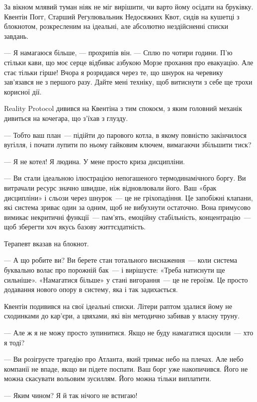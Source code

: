 \documentclass[12pt, a4paper, openany]{book}
\begin{document}
\begin{realitybox}
За вікном млявий туман ніяк не міг вирішити, чи варто йому осідати на бруківку. Квентін Погг, Старший Регулювальник Недосяжних Квот, сидів на кушетці з блокнотом, розкресленим на ідеальні, але абсолютно нездійсненні списки завдань.

--- Я намагаюся більше, --- прохрипів він. --- Сплю по чотири години. П'ю стільки кави, що моє серце відбиває азбукою Морзе прохання про евакуацію. Але стає тільки гірше! Вчора я розридався через те, що шнурок на черевику зав'язався не з першого разу. Дайте мені техніку, щоб витиснути з себе ще трохи корисної дії.

\medskip
Reality Protocol дивився на Квентіна з тим спокоєм, з яким головний механік дивиться на кочегара, що з'їхав з глузду.

--- Тобто ваш план~--- підійти до парового котла, в якому повністю закінчилося вугілля, і почати лупити по ньому гайковим ключем, вимагаючи збільшити тиск?

--- Я не котел! Я людина. У мене просто криза дисципліни.

--- Ви стали ідеальною ілюстрацією непогашеного термодинамічного боргу. Ви витрачали ресурс значно швидше, ніж відновлювали його. Ваш «брак дисципліни» і сльози через шнурок~--- це не гріхопадіння. Це запобіжні клапани, які система зриває один за одним, щоб не вибухнути остаточно. Вона примусово вимикає некритичні функції~--- пам'ять, емоційну стабільність, концентрацію~--- щоб зберегти хоч якусь базову життєздатність.

Терапевт вказав на блокнот.

--- А що робите ви? Ви берете стан тотального виснаження~--- коли система буквально волає про порожній бак~--- і вирішуєте: «Треба натиснути ще сильніше». «Намагатися більше» у стані вигорання~--- це не героїзм. Це просто додавання нового опору в систему, яка і так задихається.

\medskip
Квентін подивився на свої ідеальні списки. Літери раптом здалися йому не сходинками до кар'єри, а цвяхами, які він методично забивав у власну труну.

--- Але ж я не можу просто зупинитися. Якщо не буду намагатися щосили~--- хто я тоді?

--- Ви розігруєте трагедію про Атланта, який тримає небо на плечах. Але небо компанії не впаде, якщо ви підете поспати. Ваш борг уже накопичився. Його не можна скасувати вольовим зусиллям. Його можна тільки виплатити.

--- Яким чином? Я й так нічого не встигаю!


\end{realitybox}
\end{document}
